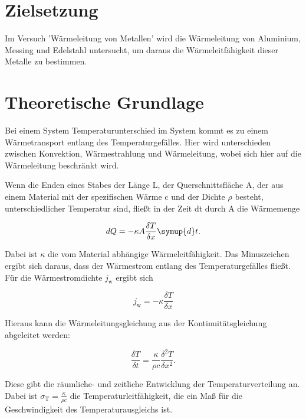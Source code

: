 \section{Zielsetzung}
    Im Versuch 'Wärmeleitung von Metallen' wird die Wärmeleitung von Aluminium, Messing und Edelstahl untersucht,
    um daraus die Wärmeleitfähigkeit dieser Metalle zu bestimmen.

    \section{Theoretische Grundlage}
      Bei einem System Temperaturunterschied im System kommt es zu einem Wärmetransport entlang des Temperaturgefälles.
      Hier wird unterschieden zwischen Konvektion, Wärmestrahlung und Wärmeleitung, wobei sich hier auf die Wärmeleitung beschränkt wird.

      \noindent Wenn die Enden eines Stabes der Länge L, der Querschnittsfläche A, der aus einem Material mit der spezifischen Wärme c und der Dichte $\rho$ besteht, unterschiedlicher Temperatur sind,
      fließt in der Zeit dt durch A die Wärmemenge 

      \begin{equation}
      dQ = - \kappa A \frac{\delta T}{\delta x} \symup{d}t .
        \label{eqn:waermemenge}
      \end{equation}

      \noindent Dabei ist $\kappa$ die vom Material abhängige Wärmeleitfähigkeit. 
      Das Minuszeichen ergibt sich daraus, dass der Wärmestrom entlang des Temperaturgefälles fließt.
      Für die Wärmestromdichte $j_\text{w}$ ergibt sich

      \begin{equation*}
      j_\text{w}=-\kappa \frac{\delta T}{\delta x}
        \label{eqn:waermestromdichte}
      \end{equation*}       
      
      \noindent Hieraus kann die Wärmeleitungsgleichung aus der Kontinuitätsgleichung abgeleitet werden:

      \begin{equation*}
      \frac{\delta T}{\delta t} = \frac{\kappa}{\rho c} \frac{\delta^2 T}{\delta x^2}.
        \label{eqn:waermeleitungsgleichung}
      \end{equation*}  

      \noindent Diese gibt die räumliche- und zeitliche Entwicklung der Temperaturverteilung an.
      Dabei ist $\sigma_\text{T} = \frac{\kappa}{\rho c}$ die Temperaturleitfähigkeit, die ein Maß für die Geschwindigkeit des Temperaturausgleichs ist.

